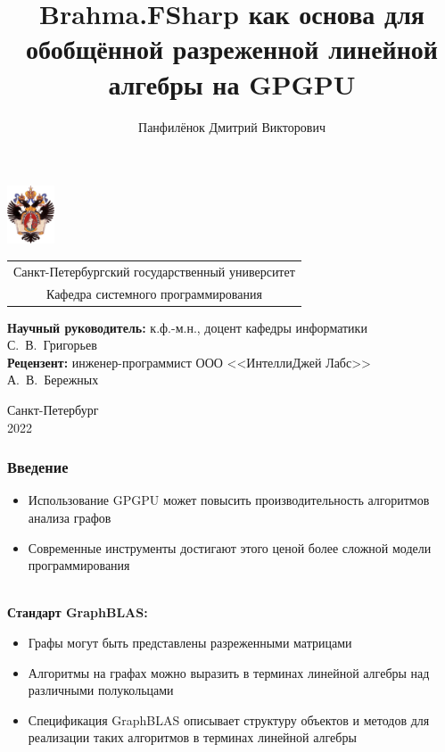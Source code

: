 \documentclass[aspectratio=169]{beamer}
\title[GraphBLAS F\#]{Brahma.FSharp как основа для обобщённой
разреженной линейной алгебры на GPGPU}
\institute[СПбГУ]{}
\author[Панфилёнок Дмитрий]{Панфилёнок Дмитрий Викторович}
\begin{document}
{
\begin{frame}
  \includegraphics[width=1.4cm]{pictures/SPbGU_Logo.png}
\vspace{-35pt}
\hspace{-10pt}
\begin{center}
  \begin{tabular}{c}
    \scriptsize{Санкт-Петербургский государственный университет} \\
    \scriptsize{Кафедра системного программирования}
    \end{tabular}
\titlepage
\end{center}

\btVFill

{\scriptsize{\bfseries Научный руководитель:} к.ф.-м.н., доцент кафедры информатики С.~В.~Григорьев \\ }
{\scriptsize{\bfseries Рецензент:} инженер-программист ООО <<ИнтеллиДжей Лабс>> А.~В.~Бережных \\ }

\begin{center}
  \vspace{5pt}
  \scriptsize{Санкт-Петербург\\
                 2022}
  \end{center}
\end{frame}
}

\begin{frame}[fragile]  
  \frametitle{Введение}
  \begin{itemize}
    \item Использование GPGPU может повысить производительность алгоритмов анализа графов
    \item Современные инструменты достигают этого ценой более сложной модели программирования
\end{itemize}

~\\
\textbf{Стандарт GraphBLAS:}
\begin{itemize}
  	\item Графы могут быть представлены разреженными матрицами
  	\item Алгоритмы на графах можно выразить в терминах линейной алгебры над различными полукольцами
    \item Спецификация GraphBLAS описывает структуру объектов и методов для реализации таких алгоритмов в терминах линейной алгебры
  \end{itemize}
\end{frame}
     
\end{document}
